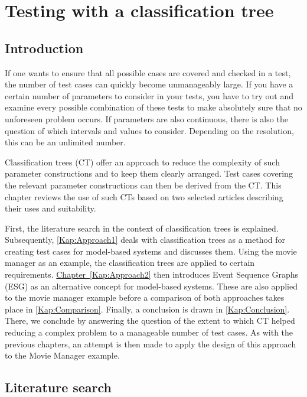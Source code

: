 \chapter{Testing with a classification tree}\label{sec:topic_5}

\section{Introduction}

If one wants to ensure that all possible cases are covered and checked in a test, the number of test cases can quickly become unmanageably large. If you have a certain number of parameters to consider in your tests, you have to try out and examine every possible combination of these tests to make absolutely sure that no unforeseen problem occurs. If parameters are also continuous, there is also the question of which intervals and values to consider. Depending on the resolution, this can be an unlimited number.

Classification trees (CT) offer an approach to reduce the complexity of such parameter constructions and to keep them clearly arranged. Test cases covering the relevant parameter constructions can then be derived from the CT. This chapter reviews the use of such CTs based on two selected articles describing their uses and suitability.

First, the literature search in the context of classification trees is explained. Subsequently, \autoref{Kap:Approach1} deals with classification trees as a method for creating test cases for model-based systems and discusses them. Using the movie manager as an example, the classification trees are applied to certain requirements. \hyperref[Chapter]{Chapter~\ref{Kap:Approach2}} then introduces Event Sequence Graphs (ESG) as an alternative concept for model-based systems. These are also applied to the movie manager example before a comparison of both approaches takes place in \autoref{Kap:Comparison}. Finally, a conclusion is drawn in \autoref{Kap:Conclusion}. There, we conclude by answering the question of the extent to which CT helped reducing a complex problem to a manageable number of test cases. As with the previous chapters, an attempt is then made to apply the design of this approach to the Movie Manager example.

\section{Literature search}

